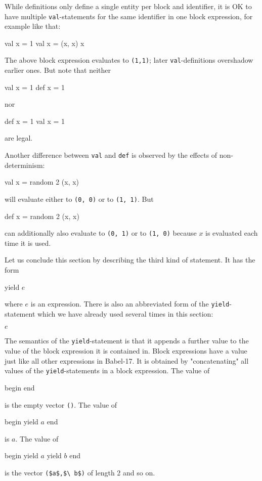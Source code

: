 \documentclass[11pt]{amsart}
\newcommand{\babelsrc}[1] {\lstinline!#1!}
\begin{document}
While definitions only define a single entity per block and identifier, it is OK to have multiple \babelsrc{val}-statements for the same identifier in one block expression, for example like that:
\begin{babellisting}
val x = 1
val x = (x, x)
x
\end{babellisting}
The above block expression evaluates to \babelsrc{(1,1)}; later \babelsrc{val}-definitions overshadow earlier ones.
But note that neither
\begin{babellisting}
val x = 1
def x = 1
\end{babellisting}
nor
\begin{babellisting}
def x = 1
val x = 1
\end{babellisting}
are legal.

Another difference between \babelsrc{val} and \babelsrc{def} is observed by the effects of non-determinism:
\begin{babellisting}
val x = random 2
(x, x)
\end{babellisting}
will evaluate either to \babelsrc{(0, 0)} or to \babelsrc{(1, 1)}. But 
\begin{babellisting}
def x = random 2
(x, x)
\end{babellisting}
can additionally also evaluate to \babelsrc{(0, 1)} or to \babelsrc{(1, 0)} because $x$ is evaluated each time it is used.

Let us conclude this section by describing the third kind of statement. It has the form
\begin{babellisting}
yield $e$
\end{babellisting}
where $e$ is an expression. There is also an abbreviated form of the \babelsrc{yield}-statement which we have already used several times in this section:
\begin{babellisting}
$e$
\end{babellisting}
The semantics of the \babelsrc{yield}-statement is that it appends a further value to the value of the block expression it is contained in. Block expressions have a value just like all other expressions in Babel-17. It is obtained by "concatenating" all values of the \babelsrc{yield}-statements in a block expression. The value of 
\begin{babellisting}
begin
end
\end{babellisting}
is the empty vector \babelsrc{()}. The value of 
\begin{babellisting}
begin
  yield $a$
end
\end{babellisting}
is $a$. The value of 
\begin{babellisting}
begin
  yield $a$
  yield $b$
end
\end{babellisting}
is the vector \babelsrc{($a$,$\ b$)} of length 2 and so on. 
\end{document}
